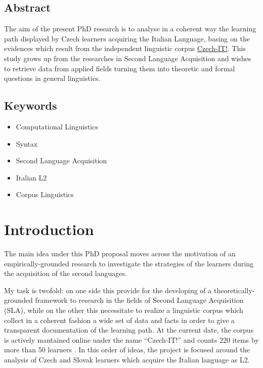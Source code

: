 \documentclass[a4paper,twoside,11pt,chapterprefix=false,bibliography=totocnumbered]{scrbook}
\providecommand{\tightlist}{%
  \setlength{\itemsep}{0pt}\setlength{\parskip}{0pt}}
\theoremstyle{definition}
\theoremstyle{definition}
\theoremstyle{definition}
\theoremstyle{remark}
\begin{document}
\section{Abstract}\label{abstract}

The aim of the present PhD research is to analyse in a coherent way the
learning path displayed by Czech learners acquiring the Italian
Language, basing on the evidences which result from the independent
linguistic corpus \href{http://czech-it.github.io}{Czech-IT!}. This
study grows up from the researches in Second Language Acquisition and
wishes to retrieve data from applied fields turning them into theoretic
and formal questions in general linguistics.

\section{Keywords}\label{keywords}

\begin{itemize}
\tightlist
\item
  Computational Linguistics
\item
  Syntax
\item
  Second Language Acquisition
\item
  Italian L2
\item
  Corpus Linguistics
\end{itemize}

\chapter{Introduction}\label{introduction}

The main idea under this PhD proposal moves across the motivation of an
empirically-grounded research to investigate the strategies of the
learners during the acquisition of the second languages.

My task is twofold: on one side this provide for the developing of a
theoretically-grounded framework to research in the fields of Second
Language Acquisition (SLA), while on the other this necessitate to
realize a linguistic corpus which collect in a coherent fashion a wide
set of data and facts in order to give a transparent documentation of
the learning path. At the current date, the corpus is actively mantained
online under the name \enquote{Czech-IT!} and counts 220 items by more
than 50 learners \citep{czech-it}. In this order of ideas, the project
is focused around the analysis of Czech and Slovak learners which
acquire the Italian language as L2.
\end{document}
